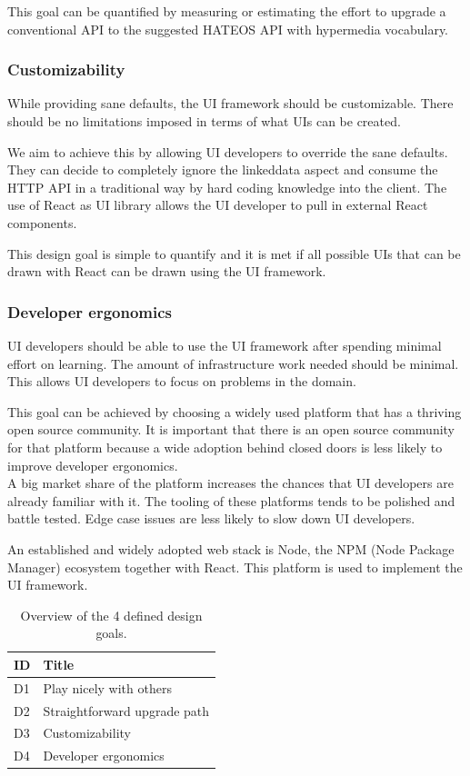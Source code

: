 This goal can be quantified by measuring or estimating the effort to upgrade a conventional API to the suggested HATEOS API with hypermedia vocabulary.

\subsubsection{Customizability}
While providing sane defaults, the UI framework should be customizable. There should be no limitations imposed in terms of what UIs can be created.

We aim to achieve this by allowing UI developers to override the sane defaults. They can decide to completely ignore the \gls{linkeddata} aspect and consume the HTTP API in a traditional way by hard coding knowledge into the client. The use of React as UI library allows the UI developer to pull in external React components.

This design goal is simple to quantify and it is met if all possible UIs that can be drawn with React can be drawn using the UI framework.

\subsubsection{Developer ergonomics}
UI developers should be able to use the UI framework after spending minimal effort on learning. The amount of infrastructure work needed should be minimal. This allows UI developers to focus on problems in the domain.

This goal can be achieved by choosing a widely used platform that has a thriving open source community. It is important that there is an open source community for that platform because a wide adoption behind closed doors is less likely to improve developer ergonomics. \\
A big market share of the platform increases the chances that UI developers are already familiar with it. The tooling of these platforms tends to be polished and battle tested. Edge case issues are less likely to slow down UI developers.

An established and widely adopted web stack is Node, the NPM (Node Package Manager) ecosystem together with React. This platform is used to implement the UI framework.

\begin{table}[!htb]
  \begin{center}
    \begin{tabular}{|l|l|}
      \hline
      \textbf{ID} & \textbf{Title}\\
      \hline
      D1 & Play nicely with others \\
      \hline
      D2 & Straightforward upgrade path \\
      \hline
      D3 & Customizability \\
      \hline
      D4 & Developer ergonomics \\
      \hline
    \end{tabular}
    \caption{Overview of the 4 defined design goals.}
    \label{tab:designgoals}
  \end{center}
\end{table}

